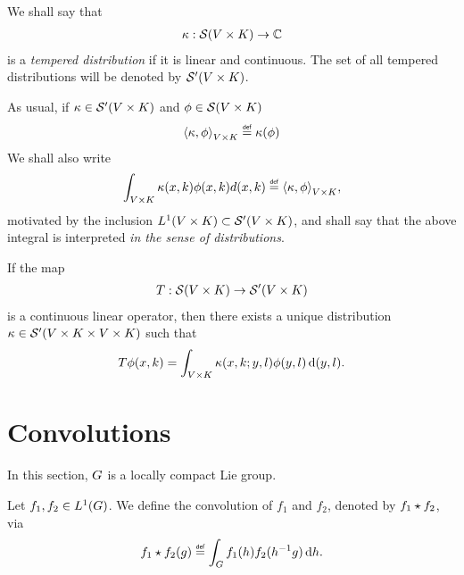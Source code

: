 \begin{definition}
    We shall say that
    \begin{align*}
        \kappa : {\mathcal{S} (V \times K)} \to \mathbb{C}
    \end{align*}
    is a \emph{tempered distribution} if it is linear and continuous.
    The set of all tempered distributions will be denoted by ${\mathcal{S}' (V \times K)}$.
\end{definition}

As usual, if $\kappa \in {\mathcal{S}' (V\times K)}$ and $\phi \in {\mathcal{S} (V\times K)}$
\begin{align*}
    \dualBracket [\GroupDirect] \kappa \phi \defeq \kappa(\phi)
\end{align*}
We shall also write
\begin{align*}
    \int_{\GroupDirect} \kappa(x, k) \phi(x, k) d(x, k) \defeq \dualBracket [\GroupDirect] \kappa \phi,
\end{align*}
motivated by the inclusion ${L^{1} (V \times K)} \subset {\mathcal{S}' (V\times K)}$,
and shall say that the above integral is interpreted \emph{in the sense of distributions}.

\begin{theorem}
\label{theorem:Schwartz_Kernel_Theorem}
    If the map
    \begin{align*}
        T : {\mathcal{S} (V \times K)} \to {\mathcal{S}' (V\times K)}
    \end{align*}
    is a continuous linear operator,
    then there exists a unique distribution
    $\kappa \in {\mathcal{S}' (V\times K\times V\times K)}$ such that
    \begin{align*}
        T \phi(x, k) = \int_{V \times K} \kappa(x, k; y, l) \phi(y, l) \,\mathrm{d} (y, l).
    \end{align*}
\end{theorem}

\section{Convolutions}

In this section,
$G$ is a locally compact Lie group.

\begin{definition}[Convolution]
    Let $f_1, f_2 \in {L^{1} (G)}$.
    We define the convolution of $f_1$ and $f_2$,
    denoted by $f_1 \star f_2$, via
    \begin{align*}
        \conv {f_1} {f_2} (g)
        \defeq \int_\Group f_1(h) f_2(h^{-1} g) \dd h.
    \end{align*}
\end{definition}

